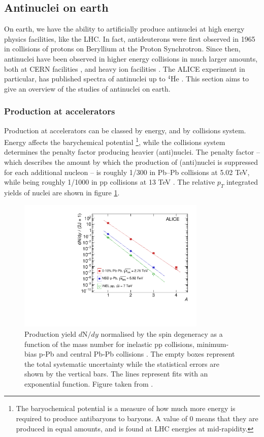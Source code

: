 \subsection{Antinuclei on earth}
On earth, we have the ability to artificially produce antinuclei at high energy physics facilities, like the LHC. In fact, antideuterons were first observed in 1965 in collisions of protons on Beryllium at the Proton Synchrotron\cite{}. Since then, antinuclei have been observed in higher energy collisions in much larger amounts, both at CERN facilities \cite{}, and heavy ion facilities \cite{}. The ALICE experiment in particular, has published spectra of antinuclei up to $^4\overline{\mathrm{He}}$ \cite{}. This section aims to give an overview of the studies of antinuclei on earth. 
\subsubsection{Production at accelerators}
Production at accelerators can be classed by energy, and by collisions system. Energy affects the barychemical potential \footnote{The baryochemical potential is a measure of how much more energy is required to produce antibaryons to baryons. A value of 0 means that they are produced in equal amounts, and is found at LHC energies at mid-rapidity\cite{}.}, while the collisions system determines the penalty factor producing heavier (anti)nuclei. The penalty factor -- which describes the amount by which the production of (anti)nuclei is suppressed for each additional nucleon -- is roughly 1/300 in Pb--Pb collisions at 5.02 TeV, while being roughly 1/1000 in pp collisions at 13 TeV \cite{}. The relative $p_T$ integrated yields of nuclei are shown in figure \ref{fig:PenaltyFactorNuclei}. \\

\begin{figure}[h!]
    \centering
    \includegraphics[width=0.8\textwidth]{figures/PenaltyFactor-97548.pdf}
    \caption{Production yield $d\mathrm{N}/dy$  normalised by the spin degeneracy as a function of the mass number for inelastic pp collisions, minimum-bias p-Pb and central Pb-Pb collisions . The empty boxes represent the total systematic uncertainty while the statistical errors are shown by the vertical bars. The lines represent fits with an exponential function. Figure taken from \cite{antinuclei_mult_dependence}.  }
    \label{fig:PenaltyFactorNuclei}
\end{figure}




